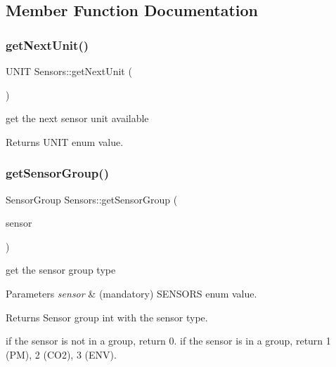 \subsection{Member Function Documentation}
\mbox{\label{classSensors_ad33c76f341c86ac1900c5953fca9c0d1}} 
\subsubsection{\texorpdfstring{get\+Next\+Unit()}{getNextUnit()}}
{\footnotesize\ttfamily U\+N\+IT Sensors\+::get\+Next\+Unit (\begin{DoxyParamCaption}{ }\end{DoxyParamCaption})}



get the next sensor unit available 

\begin{DoxyReturn}{Returns}
U\+N\+IT enum value. 
\end{DoxyReturn}
\mbox{\label{classSensors_abd4b900acd33f41c7fd184e0dad90aeb}} 
\subsubsection{\texorpdfstring{get\+Sensor\+Group()}{getSensorGroup()}}
{\footnotesize\ttfamily Sensor\+Group Sensors\+::get\+Sensor\+Group (\begin{DoxyParamCaption}\item[{S\+E\+N\+S\+O\+RS}]{sensor }\end{DoxyParamCaption})}



get the sensor group type 


\begin{DoxyParams}{Parameters}
{\em sensor} & (mandatory) S\+E\+N\+S\+O\+RS enum value. \\
\hline
\end{DoxyParams}
\begin{DoxyReturn}{Returns}
Sensor group int with the sensor type.
\end{DoxyReturn}
if the sensor is not in a group, return 0. if the sensor is in a group, return 1 (PM), 2 (C\+O2), 3 (E\+NV). \mbox{\label{classSensors_aa7ca70f31838cba52b96f76aa4a0d4a2}} 
